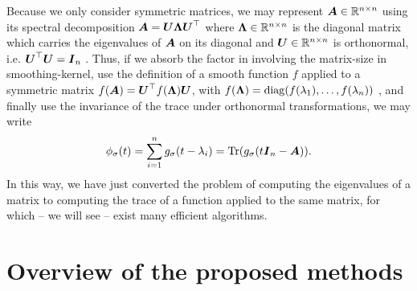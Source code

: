 Because we only consider symmetric matrices, 
we may represent $\boldsymbol{A} \in \mathbb{R}^{n \times n}$ using its spectral
decomposition $\boldsymbol{A} = \boldsymbol{U} \boldsymbol{\Lambda} \boldsymbol{U}^{\top}$ where
$\boldsymbol{\Lambda} \in \mathbb{R}^{n \times n}$ is the diagonal matrix which carries
the eigenvalues of $\boldsymbol{A}$ on its diagonal and $\boldsymbol{U} \in \mathbb{R}^{n \times n}$
is orthonormal, i.e. $\boldsymbol{U}^{\top} \boldsymbol{U} = \boldsymbol{I}_n$ \cite[theorem~4.1.5]{horn1985matrix}.
Thus, if we absorb the factor in 
involving the \gls{matrix-size} in \gls{smoothing-kernel},
use the definition of a smooth function $f$ applied to a symmetric matrix
$f(\boldsymbol{A}) = \boldsymbol{U}^{\top} f(\boldsymbol{\Lambda}) \boldsymbol{U}$,
with $f(\boldsymbol{\Lambda}) = \operatorname{diag}(f(\lambda_1), \dots, f(\lambda_n))$ \cite[definition~1.2]{higham2008functions},
and finally use the invariance of the trace under orthonormal transformations, we may write
\begin{equation}
    \phi_{\sigma}(t) = \sum_{i=1}^n g_{\sigma}(t - \lambda_i) = \operatorname{Tr}(g_{\sigma}(t\boldsymbol{I}_n - \boldsymbol{A})).
    \label{equ:1-introduction-spectral-density-as-trace}
\end{equation}
In this way, we have just converted the problem of computing the eigenvalues of
a matrix to computing the trace of a function applied to the same matrix,
for which -- we will see -- exist many efficient algorithms.


\section{Overview of the proposed methods}
\label{sec:1-introduction-overview}

